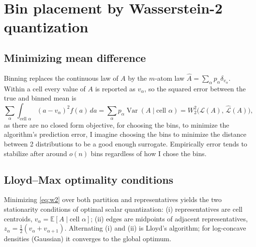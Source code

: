 \documentclass[11pt]{article}
\newcommand{\E}{\mathbb{E}}
\newcommand{\Var}{\operatorname{Var}}
\newcommand{\law}{\mathcal{L}}
\begin{document}
\section{Bin placement by Wasserstein-2 quantization}
\label{sec:w2}
\subsection{Minimizing mean difference}
Binning replaces the continuous law of $A$ by the $m$-atom law $\widehat A = \sum_\alpha p_\alpha \delta_{v_\alpha}$. Within a cell every value of $A$ is reported as $v_\alpha$, so the squared error between the true and binned mean is
\begin{equation}
\sum_\alpha \int_{\text{cell } \alpha} (a - v_\alpha)^2 f(a)\, da
= \sum_\alpha p_\alpha \Var(A \mid \text{cell } \alpha)
= W_2^2\big( \law(A),\, \widehat{\law}(A) \big),
\label{eq:w2}
\end{equation}
as there are no closed form objective, for choosing the bins, to minimize the algorithm's prediction error, I imagine choosing the bins to minimize the distance between 2 distributions to be a good enough surrogate. Empirically error tends to stabilize after around $o(n)$ bins regardless of how I chose the bins. 

\subsection{Lloyd--Max optimality conditions}
Minimizing \eqref{eq:w2} over both partition and representatives yields the two stationarity conditions of optimal scalar quantization: (i) representatives are cell centroids, $v_\alpha = \E[A \mid \text{cell } \alpha]$; (ii) edges are midpoints of adjacent representatives, $z_\alpha = \tfrac12 (v_\alpha + v_{\alpha+1})$. Alternating (i) and (ii) is Lloyd's algorithm; for log-concave densities (Gaussian) it converges to the global optimum.
\end{document}
